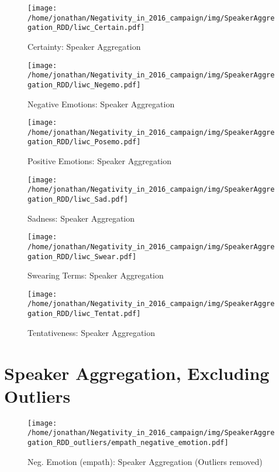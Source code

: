 \begin{figure}[h]\centering
\texttt{[image: /home/jonathan/Negativity\_in\_2016\_campaign/img/SpeakerAggregation\_RDD/liwc\_Certain.pdf]}
\caption{Certainty: Speaker Aggregation}
\label{fig: sa_Certainty}
\end
{figure}

\begin{figure}[h]\centering
\texttt{[image: /home/jonathan/Negativity\_in\_2016\_campaign/img/SpeakerAggregation\_RDD/liwc\_Negemo.pdf]}
\caption{Negative Emotions: Speaker Aggregation}
\label{fig: sa_Negative Emotions}
\end
{figure}

\begin{figure}[h]\centering
\texttt{[image: /home/jonathan/Negativity\_in\_2016\_campaign/img/SpeakerAggregation\_RDD/liwc\_Posemo.pdf]}
\caption{Positive Emotions: Speaker Aggregation}
\label{fig: sa_Positive Emotions}
\end
{figure}

\begin{figure}[h]\centering
\texttt{[image: /home/jonathan/Negativity\_in\_2016\_campaign/img/SpeakerAggregation\_RDD/liwc\_Sad.pdf]}
\caption{Sadness: Speaker Aggregation}
\label{fig: sa_Sadness}
\end
{figure}

\begin{figure}[h]\centering
\texttt{[image: /home/jonathan/Negativity\_in\_2016\_campaign/img/SpeakerAggregation\_RDD/liwc\_Swear.pdf]}
\caption{Swearing Terms: Speaker Aggregation}
\label{fig: sa_Swearing Terms}
\end
{figure}

\begin{figure}[h]\centering
\texttt{[image: /home/jonathan/Negativity\_in\_2016\_campaign/img/SpeakerAggregation\_RDD/liwc\_Tentat.pdf]}
\caption{Tentativeness: Speaker Aggregation}
\label{fig: sa_Tentativeness}
\end
{figure}

\clearpage
\pagebreak

\section{Speaker Aggregation, Excluding Outliers}

\begin{figure}[h]\centering
\texttt{[image: /home/jonathan/Negativity\_in\_2016\_campaign/img/SpeakerAggregation\_RDD\_outliers/empath\_negative\_emotion.pdf]}
\caption{Neg. Emotion (empath): Speaker Aggregation (Outliers removed)}
\label{fig: sa_Neg. Emotion (empath)}
\end
{figure}

